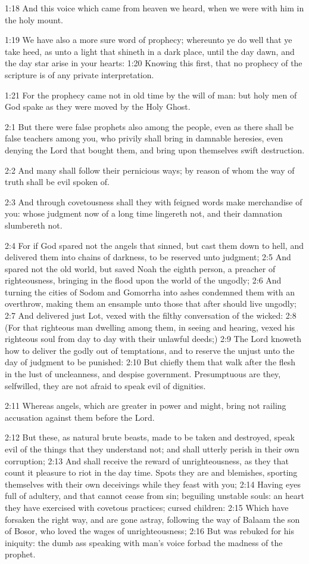 1:18 And this voice which came from heaven we heard, when we were with him in the holy mount.

1:19 We have also a more sure word of prophecy; whereunto ye do well that ye take heed, as unto a light that shineth in a dark place, until the day dawn, and the day star arise in your hearts: 1:20 Knowing this first, that no prophecy of the scripture is of any private interpretation.

1:21 For the prophecy came not in old time by the will of man: but holy men of God spake as they were moved by the Holy Ghost.

2:1 But there were false prophets also among the people, even as there shall be false teachers among you, who privily shall bring in damnable heresies, even denying the Lord that bought them, and bring upon themselves swift destruction.

2:2 And many shall follow their pernicious ways; by reason of whom the way of truth shall be evil spoken of.

2:3 And through covetousness shall they with feigned words make merchandise of you: whose judgment now of a long time lingereth not, and their damnation slumbereth not.

2:4 For if God spared not the angels that sinned, but cast them down to hell, and delivered them into chains of darkness, to be reserved unto judgment; 2:5 And spared not the old world, but saved Noah the eighth person, a preacher of righteousness, bringing in the flood upon the world of the ungodly; 2:6 And turning the cities of Sodom and Gomorrha into ashes condemned them with an overthrow, making them an ensample unto those that after should live ungodly; 2:7 And delivered just Lot, vexed with the filthy conversation of the wicked: 2:8 (For that righteous man dwelling among them, in seeing and hearing, vexed his righteous soul from day to day with their unlawful deeds;) 2:9 The Lord knoweth how to deliver the godly out of temptations, and to reserve the unjust unto the day of judgment to be punished: 2:10 But chiefly them that walk after the flesh in the lust of uncleanness, and despise government. Presumptuous are they, selfwilled, they are not afraid to speak evil of dignities.

2:11 Whereas angels, which are greater in power and might, bring not railing accusation against them before the Lord.

2:12 But these, as natural brute beasts, made to be taken and destroyed, speak evil of the things that they understand not; and shall utterly perish in their own corruption; 2:13 And shall receive the reward of unrighteousness, as they that count it pleasure to riot in the day time. Spots they are and blemishes, sporting themselves with their own deceivings while they feast with you; 2:14 Having eyes full of adultery, and that cannot cease from sin; beguiling unstable souls: an heart they have exercised with covetous practices; cursed children: 2:15 Which have forsaken the right way, and are gone astray, following the way of Balaam the son of Bosor, who loved the wages of unrighteousness; 2:16 But was rebuked for his iniquity: the dumb ass speaking with man's voice forbad the madness of the prophet.

